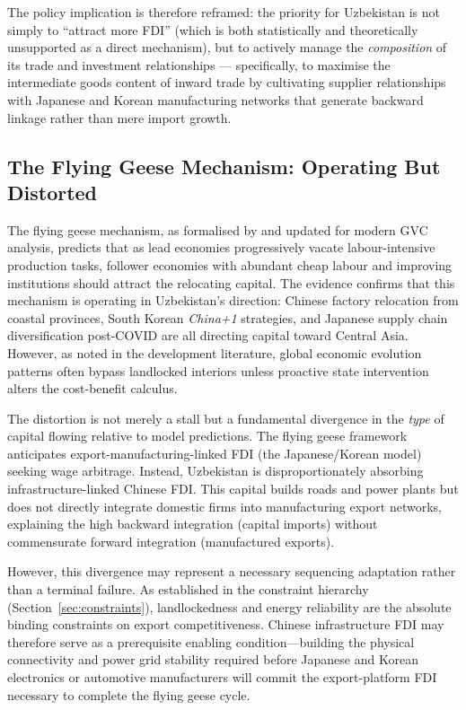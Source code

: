 The policy implication is therefore reframed: the priority for Uzbekistan is not simply to ``attract more FDI'' (which is both statistically and theoretically unsupported as a direct mechanism), but to actively manage the \textit{composition} of its trade and investment relationships --- specifically, to maximise the intermediate goods content of inward trade by cultivating supplier relationships with Japanese and Korean manufacturing networks that generate backward linkage rather than mere import growth.

\subsection{The Flying Geese Mechanism: Operating But Distorted}

The flying geese mechanism, as formalised by \citet{akamatsu1962} and updated for modern GVC analysis, predicts that as lead economies progressively vacate labour-intensive production tasks, follower economies with abundant cheap labour and improving institutions should attract the relocating capital. The evidence confirms that this mechanism is operating in Uzbekistan's direction: Chinese factory relocation from coastal provinces, South Korean \textit{China+1} strategies, and Japanese supply chain diversification post-COVID are all directing capital toward Central Asia. However, as noted in the development literature, global economic evolution patterns often bypass landlocked interiors unless proactive state intervention alters the cost-benefit calculus.

The distortion is not merely a stall but a fundamental divergence in the \textit{type} of capital flowing relative to model predictions. The flying geese framework anticipates export-manufacturing-linked FDI (the Japanese/Korean model) seeking wage arbitrage. Instead, Uzbekistan is disproportionately absorbing infrastructure-linked Chinese FDI. This capital builds roads and power plants but does not directly integrate domestic firms into manufacturing export networks, explaining the high backward integration (capital imports) without commensurate forward integration (manufactured exports).

However, this divergence may represent a necessary sequencing adaptation rather than a terminal failure. As established in the constraint hierarchy (Section~\ref{sec:constraints}), landlockedness and energy reliability are the absolute binding constraints on export competitiveness. Chinese infrastructure FDI may therefore serve as a prerequisite enabling condition---building the physical connectivity and power grid stability required before Japanese and Korean electronics or automotive manufacturers will commit the export-platform FDI necessary to complete the flying geese cycle.

